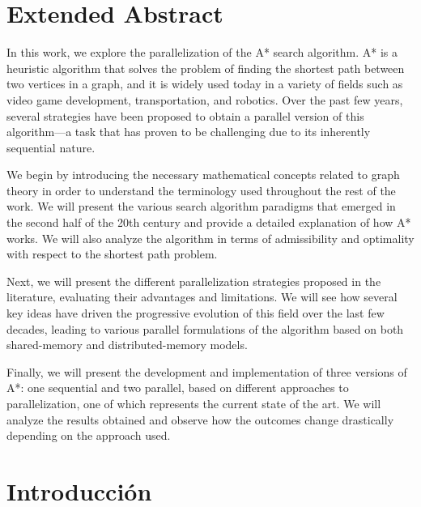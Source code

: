 \documentclass[a4paper,12pt]{article}
\begin{document}
\newpage

\section*{Extended Abstract}
\thispagestyle{empty}

In this work, we explore the parallelization of the A* search algorithm. A* is a heuristic algorithm that solves the problem of finding the shortest path between two vertices in a graph, and it is widely used today in a variety of fields such as video game development, transportation, and robotics. Over the past few years, several strategies have been proposed to obtain a parallel version of this algorithm—a task that has proven to be challenging due to its inherently sequential nature.

We begin by introducing the necessary mathematical concepts related to graph theory in order to understand the terminology used throughout the rest of the work. We will present the various search algorithm paradigms that emerged in the second half of the 20th century and provide a detailed explanation of how A* works. We will also analyze the algorithm in terms of admissibility and optimality with respect to the shortest path problem.

Next, we will present the different parallelization strategies proposed in the literature, evaluating their advantages and limitations. We will see how several key ideas have driven the progressive evolution of this field over the last few decades, leading to various parallel formulations of the algorithm based on both shared-memory and distributed-memory models.

Finally, we will present the development and implementation of three versions of A*: one sequential and two parallel, based on different approaches to parallelization, one of which represents the current state of the art. We will analyze the results obtained and observe how the outcomes change drastically depending on the approach used.

\newpage

\tableofcontents
\thispagestyle{empty}

\newpage

\section{Introducción} \label{sec:introduccion}
\end{document}
